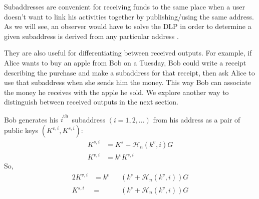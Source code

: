 Subaddresses are convenient for receiving funds to the same place when a user doesn’t want to link his activities together by publishing/using the same address. As we will see, an observer would have to solve the DLP in order to determine a given subaddress is derived from any particular address \cite{MRL-0006}.

They are also useful for differentiating between received outputs. For example, if Alice wants to buy an apple from Bob on a Tuesday, Bob could write a receipt describing the purchase and make a subaddress for that receipt, then ask Alice to use that subaddress when she sends him the money. This way Bob can associate the money he receives with the apple he sold. We explore another way to distinguish between received outputs in the next section.%

Bob generates his $i^\textsuperscript{th}$ subaddress $(i = 1, 2, ...)$ from his address as a pair of public keys $(K^{v,i}, K^{s,i})$:\\
\begin{align*}
    K^{s,i} &= K^s + \mathcal{H}_n(k^v, i) G\\
    K^{v,i} &= k^v K^{s,i}
\end{align*}
\quad So,
\begin{alignat*}{2}
    K^{v,i} &= k^v&&(k^s + \mathcal{H}_n(k^v, i))G\\
    K^{s,i} &= &&(k^s + \mathcal{H}_n(k^v, i))G
\end{alignat*}
    

